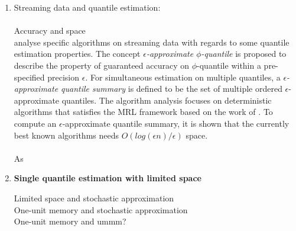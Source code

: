 \documentclass[12pt]{article}
\begin{document}
\begin{enumerate}
    \item Streaming data and quantile estimation: \\\\
    Accuracy and space \cite{greenwaldQuantilesEquidepthHistograms2016a}\\
    \citeauthor{greenwaldQuantilesEquidepthHistograms2016a}\cite{greenwaldQuantilesEquidepthHistograms2016a} analyse specific algorithms on streaming data with regards to some quantile estimation properties. The concept \textit{$\epsilon$-approximate $\phi$-quantile} is proposed to describe the property of guaranteed accuracy on $\phi$-quantile within a pre-specified precision $\epsilon$. For simultaneous estimation on multiple quantiles, a \textit{$\epsilon$-approximate quantile summary} is defined to be the set of multiple ordered $\epsilon$-approximate quantiles.
    The algorithm analysis focuses on deterministic algorithms that satisfies the MRL framework based on the work of \citeauthor{mankuApproximateMediansOther} \cite{mankuApproximateMediansOther}. To compute an $\epsilon$-approximate quantile summary, it is shown that the currently best known algorithms needs $O(log(\epsilon n)/\epsilon)$ space.
        \\\\
    As \cite{cormodeSpaceTimeefficientDeterministic2006} 

    \item \textbf{
        Single quantile estimation with limited space\\
    }
    
    Limited space and stochastic approximation\cite{tierneySpaceEfficientRecursiveProcedure1983}\\




    One-unit memory and stochastic approximation \cite{yazidiQuantileEstimationDynamic2016}\\
    One-unit memory and ummm? \cite{maFrugalStreamingEstimating2014}\\


\end{enumerate}
\end{document}

